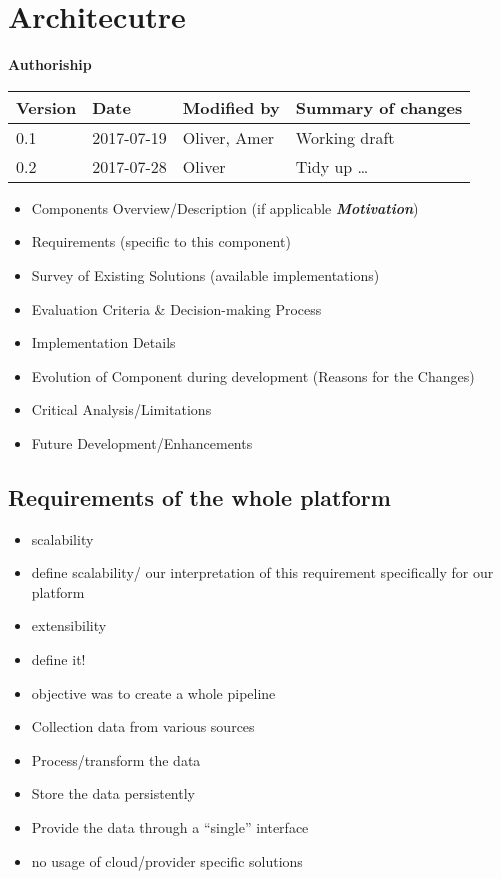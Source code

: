 \section{Architecutre}\label{architecutre}

\textbf{Authoriship}

\begin{longtable}[]{@{}llll@{}}
\toprule
Version & Date & Modified by & Summary of changes\tabularnewline
\midrule
\endhead
0.1 & 2017-07-19 & Oliver, Amer & Working draft\tabularnewline
0.2 & 2017-07-28 & Oliver & Tidy up \ldots{}\tabularnewline
\bottomrule
\end{longtable}

\begin{itemize}
\tightlist
\item
  Components Overview/Description (if applicable
  \textbf{\emph{Motivation}})
\item
  Requirements (specific to this component)
\item
  Survey of Existing Solutions (available implementations)
\item
  Evaluation Criteria \& Decision-making Process
\item
  Implementation Details
\item
  Evolution of Component during development (Reasons for the Changes)
\item
  Critical Analysis/Limitations
\item
  Future Development/Enhancements
\end{itemize}

\subsection{Requirements of the whole
platform}\label{requirements-of-the-whole-platform}

\begin{itemize}
\tightlist
\item
  scalability
\item
  define scalability/ our interpretation of this requirement
  specifically for our platform
\item
  extensibility
\item
  define it!
\item
  objective was to create a whole pipeline
\item
  Collection data from various sources
\item
  Process/transform the data
\item
  Store the data persistently
\item
  Provide the data through a ``single'' interface
\item
  no usage of cloud/provider specific solutions
\end{itemize}

